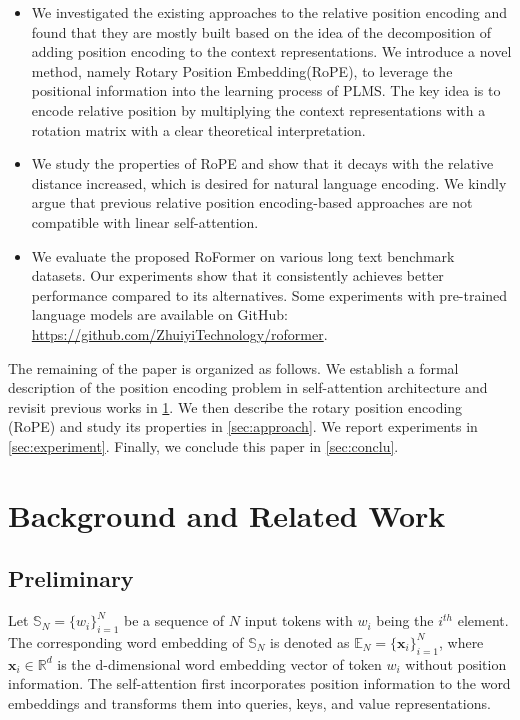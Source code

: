 \begin{itemize}
	\item We investigated the existing approaches to the relative position encoding and found that they are mostly built based on the idea of the decomposition of adding position encoding to the context representations. We introduce a novel method, namely Rotary Position Embedding(RoPE), to leverage the positional information into the learning process of PLMS. The key idea is  to encode relative position by multiplying the context representations with a rotation matrix with a clear theoretical interpretation.

	\item We study the properties of RoPE and show that it decays with the relative distance increased, which is desired for natural language encoding.  We kindly argue that previous relative position encoding-based approaches are not compatible with linear self-attention.

	\item We evaluate the proposed RoFormer on various long text benchmark datasets. Our experiments show that it consistently achieves better performance compared to its alternatives.  Some experiments with pre-trained language models are available on GitHub: \url{https://github.com/ZhuiyiTechnology/roformer}. 
\end{itemize}

The remaining of the paper is organized as follows. We establish a formal description of the position encoding problem in self-attention architecture and revisit previous works in \ref{sec:background}. We then describe the rotary position encoding (RoPE) and study its properties in \ref{sec:approach}. We report experiments in \ref{sec:experiment}. Finally, we conclude this paper in \ref{sec:conclu}.

\section{Background and Related Work}\label{sec:background}
\subsection{Preliminary}
Let $\mathbb{S}_N=\{w_i\}_{i=1}^{N}$ be a sequence of $N$ input tokens with $w_i$ being the $i^{th}$ element. The corresponding word embedding of $\mathbb{S}_N$ is denoted as $\mathbb{E}_N = \{{\boldsymbol x}_i\}_{i=1}^{N}$, where ${\boldsymbol x}_i\in \mathbb{R}^{d}$ is the d-dimensional word embedding vector of token $w_i$ without position information. The self-attention first incorporates position information to the word embeddings and transforms them into queries, keys, and value representations.

